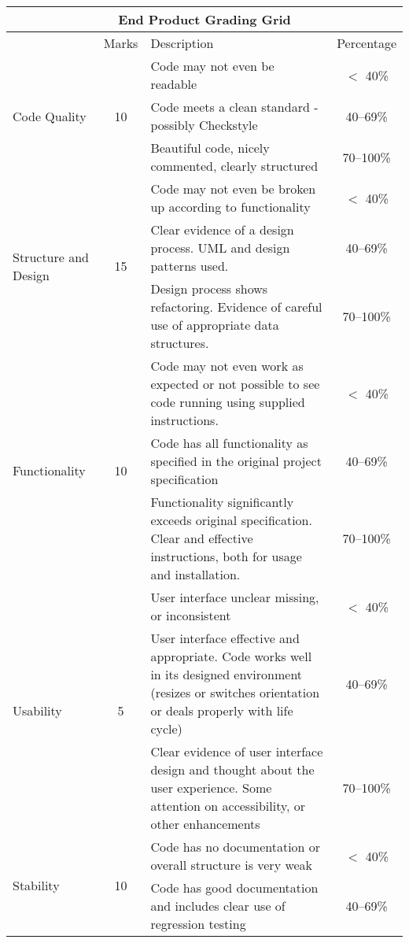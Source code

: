 \documentclass[11pt]{article}
\begin{document}
\noindent
\begin{tabular}{||l|c|p{10cm}|c||}
\hline
\hline
\multicolumn{4}{||c||}{End Product Grading Grid}\\
\hline
\hline
 & Marks& Description & Percentage \\
\hline
\hline
\multirow{3}{*}{Code Quality} & \multirow{3}{*}{10} & Code may not even be readable & $<$ 40\% \\
\cline{3-4}
&& Code meets a clean standard - possibly Checkstyle & 40--69\% \\
\cline{3-4}
&& Beautiful code, nicely commented, clearly structured  & 70--100\% \\
\hline
\hline
\multirow{3}{*}{Structure and Design} & \multirow{3}{*}{15} & Code may not even be broken up according to functionality & $<$ 40\% \\
\cline{3-4}
&&Clear evidence of a design process.  UML and design patterns used. & 40--69\%  \\
\cline{3-4}
&&Design process shows refactoring.  Evidence of careful use of appropriate data structures. & 70--100\% \\
\hline
\hline
\multirow{3}{*}{Functionality}  & \multirow{3}{*}{10} & Code may not even work as expected or not possible to see code running using supplied instructions. & $<$ 40\% \\
\cline{3-4}
&& Code has all functionality as specified in the original project specification & 40--69\%  \\
\cline{3-4}
&& Functionality significantly exceeds original specification.  Clear and effective instructions, both for usage and installation. & 70--100\%  \\
\hline
\hline
\multirow{3}{*}{Usability} & \multirow{3}{*}{5} & User interface unclear missing, or inconsistent & $<$ 40\% \\
\cline{3-4}
&& User interface effective and appropriate.  Code works well in its designed environment (resizes or switches orientation or deals properly with life cycle) & 40--69\% \\
\cline{3-4}
&& Clear evidence of user interface design and thought about the user experience.  Some attention on accessibility, or other enhancements & 70--100\%  \\
\hline
\hline
\multirow{3}{*}{Stability} & \multirow{3}{*}{10} & Code has no documentation or overall structure is very weak& $<$ 40\% \\
\cline{3-4}
&& Code has good documentation and includes clear use of regression testing  & 40--69\%  \\

\end{tabular}
\end{document}
